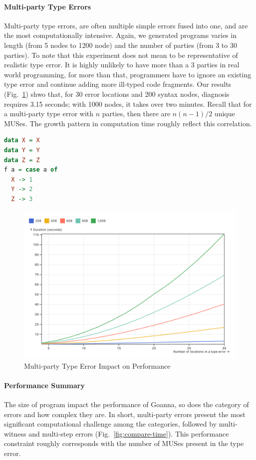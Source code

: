 \documentclass[pdflatex,sn-mathphys-num]{sn-jnl}%
\begin{document}
\paragraph{Multi-party Type Errors}

Multi-party type errors, are often multiple simple errors fused into one, and are the most computationally intensive. Again, we generated programs varies in length (from 5 nodes to 1200 node) and the number of parties (from 3 to 30 parties). To note that this experiment does not mean to be representative of realistic type error. It is highly unlikely to have more than a 3 parties in real world programming, for more than that, programmers have to ignore an existing type error and continue adding more ill-typed code fragments. Our results (Fig.~\ref{fig:multi-party-time}) shwo that, for 30 error locations and 200 syntax nodes, diagnosis requires 3.15 seconds; with 1000 nodes, it takes over two minutes. Recall that for a multi-party type error with $n$ parties, then there are $n (n - 1) / 2$ unique MUSes. The growth pattern in computation time roughly reflect this correlation.

\begin{lstlisting}[language=Haskell, caption=Multi-party Haskell Example, label={lst:eval-multi-party}]
data X = X
data Y = Y
data Z = Z
f a = case a of
  X -> 1
  Y -> 2
  Z -> 3
\end{lstlisting}

\begin{figure}[ht]
    \centering
    \includegraphics[width=0.8\linewidth]{images/multi-party-time.png}
    \caption{Multi-party Type Error Impact on Performance}
    \label{fig:multi-party-time}
\end{figure}

\paragraph{Performance Summary}
The size of program impact the performance of Goanna, so does the category of errors and how complex they are. In short, multi-party errors present the most significant computational challenge among the categories, followed by multi-witness and multi-step errors (Fig.~\ref{fig:compare-time}). This performance constraint roughly corresponds with the number of MUSes present in the type error. 
\end{document}
